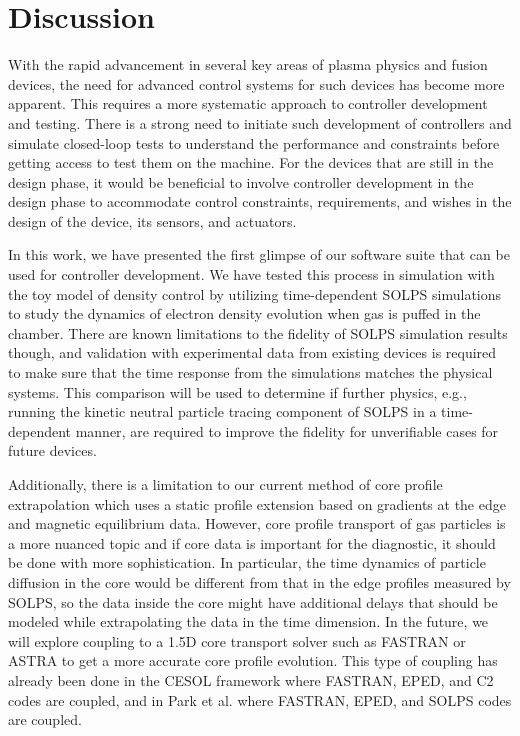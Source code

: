 \section{Discussion}{\label{sec:discussion}

With the rapid advancement in several key areas of plasma physics and fusion devices, the need for advanced control systems for such devices has become more apparent. This requires a more systematic approach to controller development and testing. There is a strong need to initiate such development of controllers and simulate closed-loop tests to understand the performance and constraints before getting access to test them on the machine. For the devices that are still in the design phase, it would be beneficial to involve controller development in the design phase to accommodate control constraints, requirements, and wishes in the design of the device, its sensors, and actuators.

In this work, we have presented the first glimpse of our software suite that can be used for controller development. We have tested this process in simulation with the toy model of density control by utilizing time-dependent SOLPS simulations to study the dynamics of electron density evolution when gas is puffed in the chamber. There are known limitations to the fidelity of SOLPS simulation results though, and validation with experimental data from existing devices is required to make sure that the time response from the simulations matches the physical systems. This comparison will be used to determine if further physics, e.g., running the kinetic neutral particle tracing component of SOLPS in a time-dependent manner\cite{Park2024}, are required to improve the fidelity for unverifiable cases for future devices.

Additionally, there is a limitation to our current method of core profile extrapolation which uses a static profile extension based on gradients at the edge and magnetic equilibrium data. However, core profile transport of gas particles is a more nuanced topic and if core data is important for the diagnostic, it should be done with more sophistication. In particular, the time dynamics of particle diffusion in the core would be different from that in the edge profiles measured by SOLPS, so the data inside the core might have additional delays that should be modeled while extrapolating the data in the time dimension. In the future, we will explore coupling to a 1.5D core transport solver such as FASTRAN\cite{park2018_FASTRAN} or ASTRA\cite{ASTRA} to get a more accurate core profile evolution. This type of coupling has already been done in the CESOL framework\cite{park2018_CESOL} where FASTRAN, EPED, and C2 codes are coupled, and in Park et al.\cite{park2023} where FASTRAN, EPED, and SOLPS codes are coupled.

}
